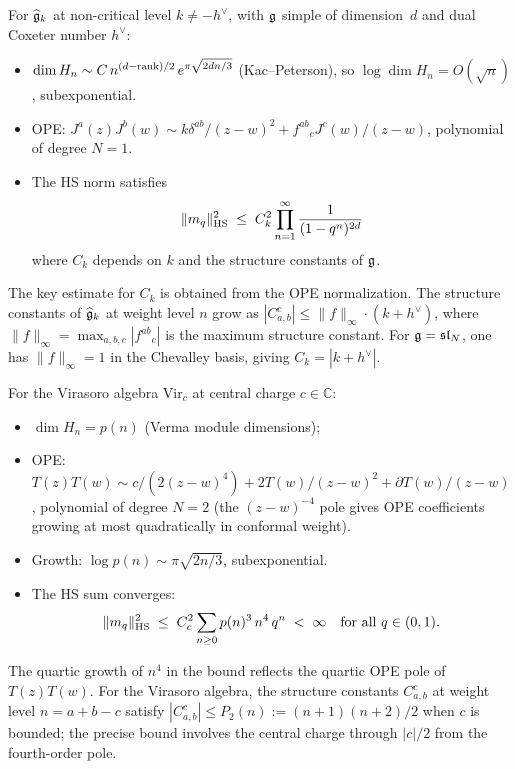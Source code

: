 \begin{computation}
For $\widehat{\mathfrak{g}}_k$ at non-critical level $k \neq -h^\vee$, with $\mathfrak{g}$ simple of dimension~$d$ and dual Coxeter number $h^\vee$:
\begin{itemize}
\item $\dim H_n \sim C\,n^{(d-\operatorname{rank})/2}\,e^{\pi\sqrt{2dn/3}}$ (Kac--Peterson), so $\log \dim H_n = O(\sqrt{n})$, subexponential.
\item OPE: $J^a(z)J^b(w) \sim k\delta^{ab}/(z-w)^2 + f^{ab}{}_c J^c(w)/(z-w)$, polynomial of degree $N = 1$.
\item The HS norm satisfies
 \begin{equation}%
 \|m_q\|_{\HS}^2 \;\leq\; C_k^2 \prod_{n=1}^\infty \frac{1}{(1-q^n)^{2d}}
 \end{equation}
 where $C_k$ depends on $k$ and the structure constants of $\mathfrak{g}$.
\end{itemize}
The key estimate for $C_k$ is obtained from the OPE normalization. The structure constants of $\widehat{\mathfrak{g}}_k$ at weight level $n$ grow as $|C^c_{a,b}| \leq \|f\|_\infty \cdot (k+h^\vee)$, where $\|f\|_\infty = \max_{a,b,c} |f^{ab}{}_c|$ is the maximum structure constant. For $\mathfrak{g} = \mathfrak{sl}_N$, one has $\|f\|_\infty = 1$ in the Chevalley basis, giving $C_k = |k + h^\vee|$.
\end{computation}

\begin{computation}
For the Virasoro algebra $\mathrm{Vir}_c$ at central charge $c \in \mathbb{C}$:
\begin{itemize}
\item $\dim H_n = p(n)$ (Verma module dimensions);
\item OPE: $T(z)T(w) \sim c/(2(z-w)^4) + 2T(w)/(z-w)^2 + \partial T(w)/(z-w)$, polynomial of degree $N = 2$ (the $(z-w)^{-4}$ pole gives OPE coefficients growing at most quadratically in conformal weight).
\item Growth: $\log p(n) \sim \pi\sqrt{2n/3}$, subexponential.
\item The HS sum converges:
 \begin{equation}%
 \|m_q\|_{\HS}^2 \;\leq\; C_c^2 \sum_{n \geq 0} p(n)^3\,n^{4}\,q^n \;<\; \infty \quad\text{for all } q \in (0,1).
 \end{equation}
\end{itemize}
The quartic growth of $n^4$ in the bound reflects the quartic OPE pole of $T(z)T(w)$. For the Virasoro algebra, the structure constants $C^c_{a,b}$ at weight level $n = a + b - c$ satisfy $|C^c_{a,b}| \leq P_2(n) := (n+1)(n+2)/2$ when $c$ is bounded; the precise bound involves the central charge through $|c|/2$ from the fourth-order pole.
\end{computation}

